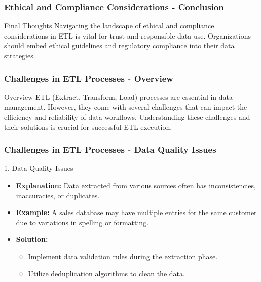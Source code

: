 \documentclass[aspectratio=169]{beamer}
\begin{document}
\begin{frame}[fragile]
    \frametitle{Ethical and Compliance Considerations - Conclusion}
    \begin{block}{Final Thoughts}
        Navigating the landscape of ethical and compliance considerations in ETL is vital for trust and responsible data use. 
        Organizations should embed ethical guidelines and regulatory compliance into their data strategies.
    \end{block}
\end{frame}

\begin{frame}[fragile]
    \frametitle{Challenges in ETL Processes - Overview}
    \begin{block}{Overview}
        ETL (Extract, Transform, Load) processes are essential in data management. 
        However, they come with several challenges that can impact the efficiency and reliability of data workflows. 
        Understanding these challenges and their solutions is crucial for successful ETL execution.
    \end{block}
\end{frame}

\begin{frame}[fragile]
    \frametitle{Challenges in ETL Processes - Data Quality Issues}
    \begin{block}{1. Data Quality Issues}
        \begin{itemize}
            \item \textbf{Explanation:} Data extracted from various sources often has inconsistencies, inaccuracies, or duplicates.
            \item \textbf{Example:} A sales database may have multiple entries for the same customer due to variations in spelling or formatting.
            \item \textbf{Solution:}
            \begin{itemize}
                \item Implement data validation rules during the extraction phase.
                \item Utilize deduplication algorithms to clean the data.
            \end{itemize}
        \end{itemize}
    \end{block}
\end{frame}
\end{document}
